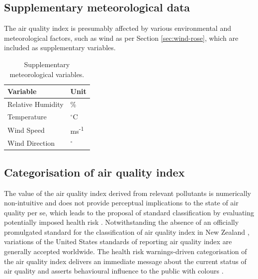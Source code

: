\documentclass{aucklandthesis}
\begin{document}
\hypertarget{supplementary-meteorological-data}{%
\subsection{Supplementary meteorological data}\label{supplementary-meteorological-data}}

The air quality index is presumably affected by various environmental and meteorological factors, such as wind as per Section \ref{sec:wind-rose}, which are included as supplementary variables.

\begin{table}[ht]
\begin{center}
\begin{tabular}{ll}
\toprule
Variable & Unit \\
\midrule
Relative Humidity & \% \\
Temperature & $^{\circ}$C \\
Wind Speed & ms\textsuperscript{-1} \\
Wind Direction & $^{\circ}$ \\
\bottomrule
\end{tabular}
\caption{Supplementary meteorological variables.}
\label{tab:met-dataset}
\end{center}
\end{table}

\hypertarget{categorisation-of-air-quality-index}{%
\subsection{Categorisation of air quality index}\label{categorisation-of-air-quality-index}}

The value of the air quality index derived from relevant pollutants is numerically non-intuitive and does not provide perceptual implications to the state of air quality per se, which leads to the proposal of standard classification by evaluating potentially imposed health risk \autocite{aqidef}. Notwithstanding the absence of an officially promulgated standard for the classification of air quality index in New Zealand \autocite{nzaqrg}, variations of the United States standards of reporting air quality index \autocite{usaqrs} are generally accepted worldwide. The health risk warnings-driven categorisation of the air quality index delivers an immediate message about the current status of air quality and asserts behavioural influence to the public with colours \autocite{colwarn}.
\end{document}
